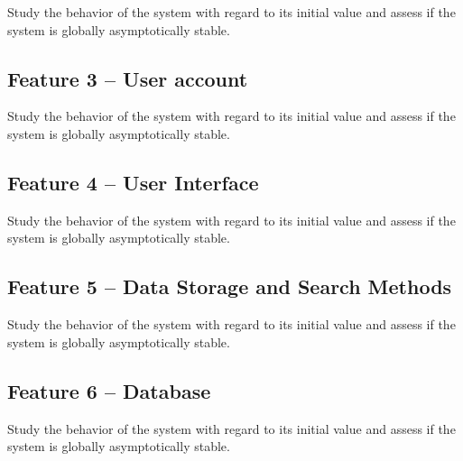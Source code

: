 \documentclass[a4paper]{article} %
\begin{document}
Study the behavior of the system with regard to its initial value and assess if the system is globally asymptotically stable.

\subsection*{Feature 3 -- User account}
\label{task1:feature3}

Study the behavior of the system with regard to its initial value and assess if the system is globally asymptotically stable.

\subsection*{Feature 4 -- User Interface}
\label{task1:feature4}

Study the behavior of the system with regard to its initial value and assess if the system is globally asymptotically stable.

\subsection*{Feature 5 -- Data Storage and Search Methods}
\label{task1:feature5}

Study the behavior of the system with regard to its initial value and assess if the system is globally asymptotically stable.

\subsection*{Feature 6 -- Database}
\label{task1:feature6}

Study the behavior of the system with regard to its initial value and assess if the system is globally asymptotically stable.







\clearpage %
\end{document}
